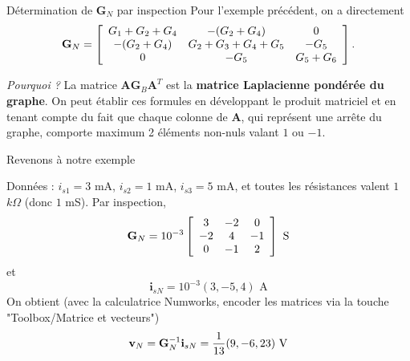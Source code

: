 \begin{frame}{Détermination de $\mathbf{G}_N$ par inspection}
Pour l'exemple précédent, on a directement 
\[
{\bf G}_N =
\left[ \begin{array}{ccc}
G_1+G_2+G_4 & -(G_2+G_4) & 0 \\
-(G_2+G_4) & G_2+G_3+G_4+G_5 & -G_5\\
0 & -G_5 & G_5+G_6
\end{array} \right]. \]

\vspace{1cm}

\textit{Pourquoi ?} La matrice $\mathbf{A} \mathbf{G}_B \mathbf{A}^T$ est la\textbf{ matrice Laplacienne pondérée du graphe}.
On peut établir ces formules en développant le produit matriciel et en tenant compte du fait que chaque colonne de $\mathbf{A}$, qui représent une arrête du graphe, comporte maximum 2 éléments non-nuls valant $1$ ou $-1$.

\end{frame}

\begin{frame}{Revenons à notre exemple}

Données : $i_{s1} = 3$ mA, $i_{s2} = 1$ mA, $i_{s3} = 5$ mA, et toutes les résistances valent $1$ $k\Omega$ (donc $1$ mS).
Par inspection, 
$$
{\bf G}_N = 10^{-3}
\left[ \begin{array}{ccc}
3 & -2 & 0 \\
-2 & 4 & -1\\
0 & -1 & 2
\end{array} \right] \text{ S}$$
et 
$$\mathbf{i}_{sN} = 10^{-3}(3, -5, 4) \text{ A}$$
On obtient (avec la calculatrice Numworks, encoder les matrices via la touche "Toolbox/Matrice et vecteurs")
$$\mathbf{v}_{N} = {\bf G}_N^{-1}\mathbf{i}_{sN} =  \frac{1}{13}(9, -6, 23) \text{ V}$$



\end{frame}

